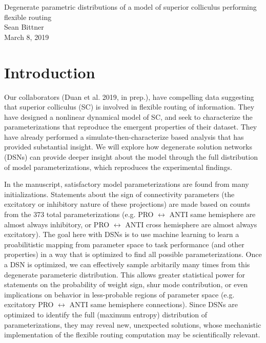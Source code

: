 \documentclass[11pt]{article}
\begin{document}
\medskip                        %

\thispagestyle{plain}
\begin{center}                  %
{\Large Degenerate parametric distributions of a model of superior colliculus performing flexible routing} \\
Sean Bittner \\
March 8, 2019 \\
\end{center}

\section{Introduction}
\noindent Our collaborators (Duan et al. 2019, in prep.), have compelling data suggesting that superior colliculus (SC) is involved in flexible routing of information.  They have designed a nonlinear dynamical model of SC, and seek to characterize the parameterizations that reproduce the emergent properties of their dataset.  They have already performed a simulate-then-characterize based analysis that has provided substantial insight.  We will explore how degenerate solution networks (DSNs) can provide deeper insight about the model through the full distribution of model parameterizations, which reproduces the experimental findings.

In the manuscript, satisfactory model parameterizations are found from many initializations.  Statements about the sign of connectivity parameters (the excitatory or inhibitory nature of these projections) are made based on counts from the 373 total parameterizations (e.g. PRO $\leftrightarrow$ ANTI same hemisphere are almost always inhibitory, or PRO $\leftrightarrow$ ANTI cross hemisphere are almost always excitatory).  The goal here with DSNs is to use machine learning to learn a proabilitistic mapping from parameter space to task performance (and other properties) in a way that is optimized to find all possible parameterizations.  Once a DSN is optimized, we can effectively sample arbitarily many times from this degenerate parameteric distribution.  This allows greater statistical power for statements on the probability of weight sign, shur mode contribution, or even implications on behavior in less-probable regions of parameter space (e.g. excitatory PRO $\leftrightarrow$ ANTI same hemisphere connections).  Since DSNs are optimized to identify the full (maximum entropy) distribution of parameterizations, they may reveal new, unexpected solutions, whose mechanistic implementation of the flexible routing computation may be scientifically relevant.
\end{document}

